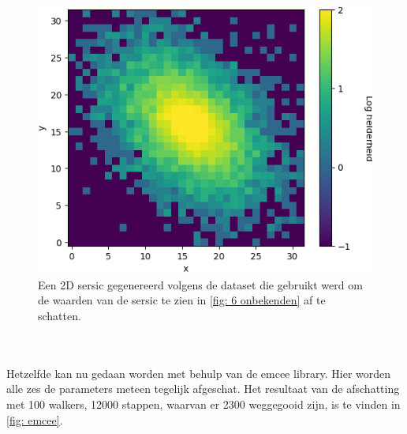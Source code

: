 \begin{figure}
    \centering
    \includegraphics[width=0.95\linewidth]{Figures/sersic.png}
    \caption{Een 2D sersic gegenereerd volgens de dataset die gebruikt werd om de waarden van de sersic te zien in \cref{fig: 6 onbekenden} af te schatten.}
    \label{fig: af te schatten sersic}
\end{figure}\mbox{}\\ \\
Hetzelfde kan nu gedaan worden met behulp van de emcee library. Hier worden alle zes de parameters meteen tegelijk afgeschat. Het resultaat van de afschatting met 100 walkers, 12000 stappen, waarvan er 2300 weggegooid zijn, is te vinden in \cref{fig: emcee}.
